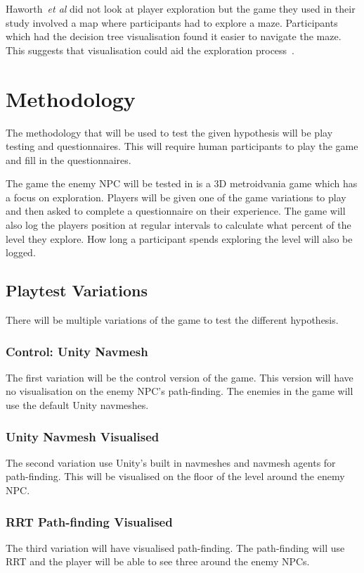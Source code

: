 \documentclass[journal]{IEEEtran}
\begin{document}
Haworth~\textit{et al} did not look at player exploration but the game they used in their study involved a map where participants had to explore a maze. Participants which had the decision tree visualisation found it easier to navigate the maze. This suggests that visualisation could aid the exploration process~\cite{Haworth2010}.

\section{Methodology}
The methodology that will be used to test the given hypothesis will be play testing and questionnaires. This will require human participants to play the game and fill in the questionnaires. 

The game the enemy NPC will be tested in is a 3D metroidvania game which has a focus on exploration. Players will be given one of the game variations to play and then asked to complete a questionnaire on their experience. The game will also log the players position at regular intervals to calculate what percent of the level they explore. How long a participant spends exploring the level will also be logged.  

\subsection{Playtest Variations}
There will be multiple variations of the game to test the different hypothesis. 

\subsubsection{Control: Unity Navmesh}
The first variation will be the control version of the game. This version will have no visualisation on the enemy NPC's path-finding. The enemies in the game will use the default Unity navmeshes.

\subsubsection{Unity Navmesh Visualised}
The second variation use Unity's built in navmeshes and navmesh agents for path-finding. This will be visualised on the floor of the level around the enemy NPC.

\subsubsection{RRT Path-finding Visualised}
The third variation will have visualised path-finding. The path-finding will use RRT and the player will be able to see three around the enemy NPCs.
\end{document}
